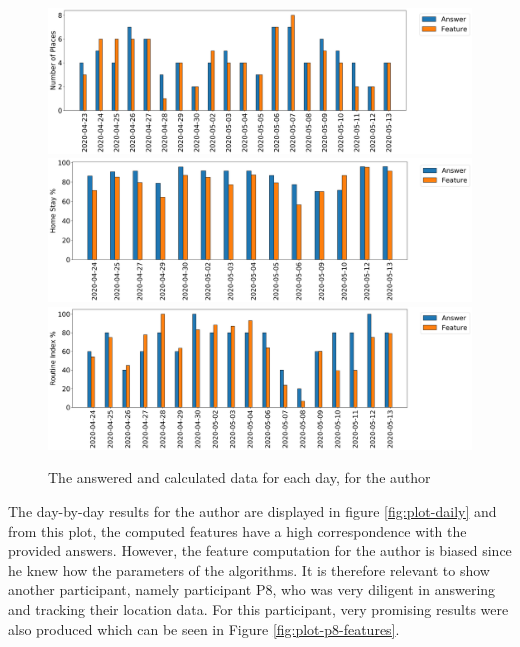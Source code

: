 \begin{figure}[h]
    \centering
    \includegraphics[width=\textwidth]{images/study/places_d6b2d9b9-398b-4e0d-b52b-224747f515c8.png}
    \includegraphics[width=\textwidth]{images/study/homestay_d6b2d9b9-398b-4e0d-b52b-224747f515c8.png}
    \includegraphics[width=\textwidth]{images/study/routine_d6b2d9b9-398b-4e0d-b52b-224747f515c8.png}
    \caption{The answered and calculated data for each day, for the author}
    \label{fig:plot-author-features}
\end{figure}

The day-by-day results for the author are displayed in figure \ref{fig:plot-daily} and from this plot, the computed features have a high correspondence with the provided answers. However, the feature computation for the author is biased since he knew how the parameters of the algorithms. It is therefore relevant to show another participant, namely participant P8, who was very diligent in answering and tracking their location data. For this participant, very promising results were also produced which can be seen in Figure \ref{fig:plot-p8-features}.

